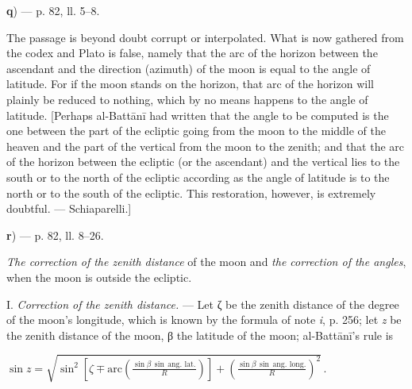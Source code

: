 \documentclass[11pt]{article}
\begin{document}
\par\begin{center}\textbf{q}) — p. 82, ll. 5–8.\end{center}
\par The passage is beyond doubt corrupt or interpolated. What is now gathered from the codex and Plato is false, namely that the arc of the horizon between the ascendant and the direction (azimuth) of the moon is equal to the angle of latitude. For if the moon stands on the horizon, that arc of the horizon will plainly be reduced to nothing, which by no means happens to the angle of latitude. [Perhaps al-Battānī had written that the angle to be computed is the one between the part of the ecliptic going from the moon to the middle of the heaven and the part of the vertical from the moon to the zenith; and that the arc of the horizon between the ecliptic (or the ascendant) and the vertical lies to the south or to the north of the ecliptic according as the angle of latitude is to the north or to the south of the ecliptic. This restoration, however, is extremely doubtful. — Schiaparelli.]\par
\par\begin{center}\textbf{r}) — p. 82, ll. 8–26.\end{center}
\par \emph{The correction of the zenith distance} of the moon and \emph{the correction of the angles}, when the moon is outside the ecliptic.\par
\par I. \emph{Correction of the zenith distance.} — Let {\greekfont ζ} be the zenith distance of the degree of the moon's longitude, which is known by the formula of note \emph{i}, p. 256; let \emph{z} be the zenith distance of the moon, {\greekfont β} the latitude of the moon; al-Battānī's rule is \par\noindent\hspace*{1.5em}$\displaystyle \sin z = \sqrt{\sin^{2}\left[\zeta \mp \text{arc}\left(\frac{\sin\beta\,\sin\,\text{ang. lat.}}{R}\right)\right] + \left(\frac{\sin\beta\,\sin\,\text{ang. long.}}{R}\right)^{2}}\,.$\par\par
\begin{center}\end{center}
\end{document}
